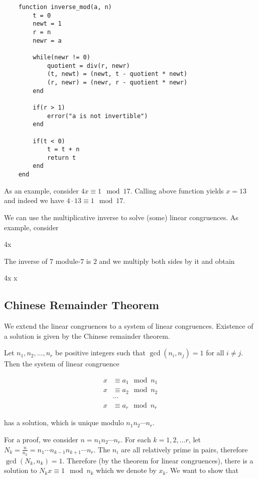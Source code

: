 \begin{verbatim}
    function inverse_mod(a, n)
        t = 0
        newt = 1
        r = n
        newr = a

        while(newr != 0)
            quotient = div(r, newr)
            (t, newt) = (newt, t - quotient * newt) 
            (r, newr) = (newr, r - quotient * newr)
        end

        if(r > 1)
            error("a is not invertible")
        end

        if(t < 0)
            t = t + n
            return t
        end
    end
\end{verbatim}

As an example, consider $4x \equiv 1 \mod 17$. Calling above function yields $x = 13$ and indeed we have $4 \cdot 13 \equiv 1 \mod 17$.

We can use the multiplicative inverse to solve (some) linear congruences. As example, consider

\bee
4x  
\eee

The inverse of $7$ module-$7$ is $2$ and we multiply both sides by it and obtain

 \cdot 4x    \rightarrow x  
\eee


\subsection{Chinese Remainder Theorem}

We extend the linear congruences to a system of linear congruences. Existence of a solution is given by the Chinese remainder theorem.

\begin{theorem}
    Let $n_1, n_2, \ldots, n_r$ be positive integers such that $\gcd(n_i, n_j) = 1$ for all $i \neq j$. Then the system of linear congruence

    \begin{align*}
        x &\equiv a_1 \mod n_1 \\
        x &\equiv a_2 \mod n_2 \\
        & \cdots \\
        x &\equiv a_r \mod n_r
    \end{align*}

    has a solution, which is unique modulo $n_1 n_2 \cdots n_r$.
\end{theorem}

For a proof, we consider $n = n_1 n_2 \cdots n_r$. For each $k=1, 2, \ldots r$, let $N_k = \frac{n}{n_k} = n_1 \cdots n_{k-1} n_{k+1} \cdots n_r$. The $n_i$ are all relatively prime in pairs, therefore $\gcd(N_k, n_k) = 1$. Therefore (by the theorem for linear congruences), there is a solution to $N_k x \equiv 1 \mod n_k$ which we denote by $x_k$. We want to show that

